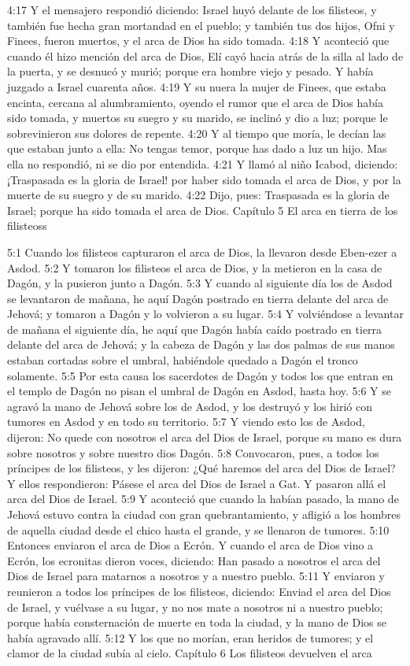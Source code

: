 4:17 Y el mensajero respondió diciendo: Israel huyó delante de los filisteos, y también fue hecha gran mortandad en el pueblo; y también tus dos hijos, Ofni y Finees, fueron muertos, y el arca de Dios ha sido tomada. 
4:18 Y aconteció que cuando él hizo mención del arca de Dios, Elí cayó hacia atrás de la silla al lado de la puerta, y se desnucó y murió; porque era hombre viejo y pesado. Y había juzgado a Israel cuarenta años.  
4:19 Y su nuera la mujer de Finees, que estaba encinta, cercana al alumbramiento, oyendo el rumor que el arca de Dios había sido tomada, y muertos su suegro y su marido, se inclinó y dio a luz; porque le sobrevinieron sus dolores de repente.  
4:20 Y al tiempo que moría, le decían las que estaban junto a ella: No tengas temor, porque has dado a luz un hijo. Mas ella no respondió, ni se dio por entendida.  
4:21 Y llamó al niño Icabod, diciendo: ¡Traspasada es la gloria de Israel! por haber sido tomada el arca de Dios, y por la muerte de su suegro y de su marido.  
4:22 Dijo, pues: Traspasada es la gloria de Israel; porque ha sido tomada el arca de Dios.  
Capítulo 5
El arca en tierra de los filisteoss  

5:1 Cuando los filisteos capturaron el arca de Dios, la llevaron desde Eben-ezer a Asdod.  
5:2 Y tomaron los filisteos el arca de Dios, y la metieron en la casa de Dagón, y la pusieron junto a Dagón.  
5:3 Y cuando al siguiente día los de Asdod se levantaron de mañana, he aquí Dagón postrado en tierra delante del arca de Jehová; y tomaron a Dagón y lo volvieron a su lugar.  
5:4 Y volviéndose a levantar de mañana el siguiente día, he aquí que Dagón había caído postrado en tierra delante del arca de Jehová; y la cabeza de Dagón y las dos palmas de sus manos estaban cortadas sobre el umbral, habiéndole quedado a Dagón el tronco solamente.  
5:5 Por esta causa los sacerdotes de Dagón y todos los que entran en el templo de Dagón no pisan el umbral de Dagón en Asdod, hasta hoy.  
5:6 Y se agravó la mano de Jehová sobre los de Asdod, y los destruyó y los hirió con tumores en Asdod y en todo su territorio.  
5:7 Y viendo esto los de Asdod, dijeron: No quede con nosotros el arca del Dios de Israel, porque su mano es dura sobre nosotros y sobre nuestro dios Dagón.  
5:8 Convocaron, pues, a todos los príncipes de los filisteos, y les dijeron: ¿Qué haremos del arca del Dios de Israel? Y ellos respondieron: Pásese el arca del Dios de Israel a Gat. Y pasaron allá el arca del Dios de Israel.  
5:9 Y aconteció que cuando la habían pasado, la mano de Jehová estuvo contra la ciudad con gran quebrantamiento, y afligió a los hombres de aquella ciudad desde el chico hasta el grande, y se llenaron de tumores.  
5:10 Entonces enviaron el arca de Dios a Ecrón. Y cuando el arca de Dios vino a Ecrón, los ecronitas dieron voces, diciendo: Han pasado a nosotros el arca del Dios de Israel para matarnos a nosotros y a nuestro pueblo.  
5:11 Y enviaron y reunieron a todos los príncipes de los filisteos, diciendo: Enviad el arca del Dios de Israel, y vuélvase a su lugar, y no nos mate a nosotros ni a nuestro pueblo; porque había consternación de muerte en toda la ciudad, y la mano de Dios se había agravado allí.  
5:12 Y los que no morían, eran heridos de tumores; y el clamor de la ciudad subía al cielo.  
Capítulo 6
Los filisteos devuelven el arca  

